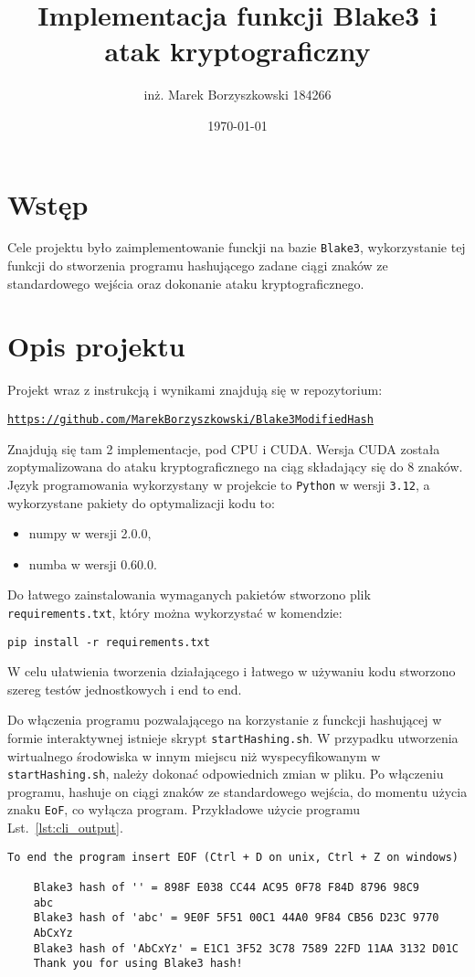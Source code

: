 \documentclass[polish,envcountsect,10pt]{article}
\title{Implementacja funkcji Blake3 i atak kryptograficzny}
\author{inż. Marek Borzyszkowski 184266}
\date{\today}
\begin{document}
\maketitle
\tableofcontents
\newpage
\section{Wstęp}
Cele projektu było zaimplementowanie funckji na bazie \texttt{Blake3}, 
wykorzystanie tej funkcji do stworzenia programu hashującego zadane ciągi znaków ze standardowego wejścia oraz dokonanie ataku kryptograficznego.
\section{Opis projektu}
Projekt wraz z instrukcją i wynikami znajdują się w repozytorium: \

\href{https://github.com/MarekBorzyszkowski/Blake3ModifiedHash}{\texttt{https://github.com/MarekBorzyszkowski/Blake3ModifiedHash}}

Znajdują się tam 2 implementacje, pod CPU i CUDA. Wersja CUDA została zoptymalizowana do ataku kryptograficznego na ciąg składający się do 8 znaków.
Język programowania wykorzystany w projekcie to \texttt{Python} w wersji \texttt{3.12}, a wykorzystane pakiety do optymalizacji kodu to:
\begin{itemize}
	\item numpy w wersji 2.0.0,
	\item numba w wersji 0.60.0.
\end{itemize}
Do łatwego zainstalowania wymaganych pakietów stworzono plik \texttt{requirements.txt}, który można wykorzystać w komendzie:

\texttt{pip install -r requirements.txt}

W celu ułatwienia tworzenia działającego i łatwego w używaniu kodu stworzono szereg testów jednostkowych i end to end. 

Do włączenia programu pozwalającego na korzystanie z funckcji hashującej w formie interaktywnej istnieje skrypt \texttt{startHashing.sh}. W przypadku utworzenia 
wirtualnego środowiska w innym miejscu niż wyspecyfikowanym w \texttt{startHashing.sh}, należy dokonać odpowiednich zmian w pliku.
Po włączeniu programu, hashuje on ciągi znaków ze standardowego wejścia, do momentu użycia znaku \texttt{EoF}, co wyłącza program.
Przykładowe użycie programu Lst.~\ref{lst:cli_output}.
\begin{lstlisting}[caption={Przykładowy przebieg działanaia programu}, label={lst:cli_output}]
	To end the program insert EOF (Ctrl + D on unix, Ctrl + Z on windows)

	Blake3 hash of '' = 898F E038 CC44 AC95 0F78 F84D 8796 98C9 
	abc
	Blake3 hash of 'abc' = 9E0F 5F51 00C1 44A0 9F84 CB56 D23C 9770 
	AbCxYz
	Blake3 hash of 'AbCxYz' = E1C1 3F52 3C78 7589 22FD 11AA 3132 D01C 
	Thank you for using Blake3 hash!	
\end{lstlisting}
\end{document}
